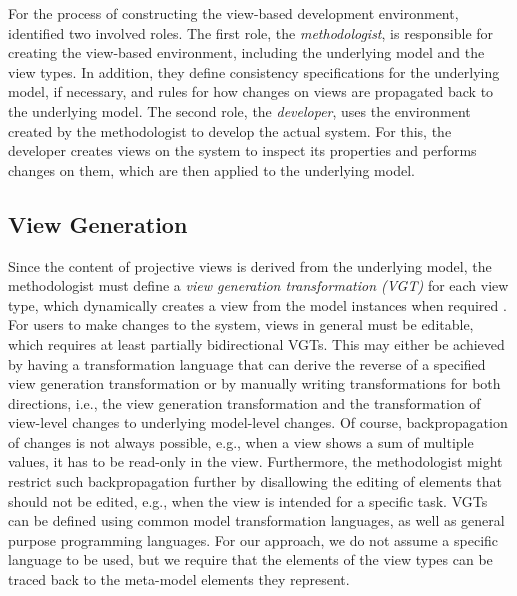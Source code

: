 For the process of constructing the view-based development environment, \textcite{atkinson_orthographic_2010} identified two involved roles.
The first role, the \emph{methodologist}, is responsible for creating the view-based environment, including the underlying model and the view types.
In addition, they define consistency specifications for the underlying model, if necessary, and rules for how changes on views are propagated back to the underlying model.
The second role, the \emph{developer}, uses the environment created by the methodologist to develop the actual system.
For this, the developer creates views on the system to inspect its properties and performs changes on them, which are then applied to the underlying model.

\subsection{View Generation}
\label{sec:ViewGeneration}

Since the content of projective views is derived from the underlying model, the methodologist must define a \emph{view generation transformation (VGT)} for each view type, which dynamically creates a view from the model instances when required \cite{tunjic_synchronization_2015}.
For users to make changes to the system, views in general must be editable, which requires at least partially bidirectional VGTs.
This may either be achieved by having a transformation language that can derive the reverse of a specified view generation transformation or by manually writing transformations for both directions, i.e., the view generation transformation and the transformation of view-level changes to underlying model-level changes.
Of course, backpropagation of changes is not always possible, e.g., when a view shows a sum of multiple values, it has to be read-only in the view.
Furthermore, the methodologist might restrict such backpropagation further by disallowing the editing of elements that should not be edited, e.g., when the view is intended for a specific task.
VGTs can be defined using common model transformation languages, as well as general purpose programming languages.
For our approach, we do not assume a specific language to be used, but we require that the elements of the view types can be traced back to the meta-model elements they represent.

